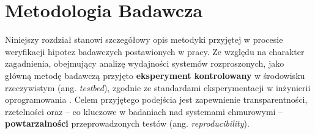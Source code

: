 \newpage


% 
% 
% 
% 
% 
% 
% 
% 
% 
% 
% 
% 
% 


\section{Metodologia Badawcza}

Niniejszy rozdział stanowi szczegółowy opis metodyki przyjętej w procesie weryfikacji hipotez badawczych postawionych 
w pracy. Ze względu na charakter zagadnienia, obejmujący analizę wydajności systemów rozproszonych, jako główną metodę 
badawczą przyjęto \textbf{eksperyment kontrolowany} w środowisku rzeczywistym (ang. \textit{testbed}), zgodnie ze 
standardami eksperymentacji w inżynierii oprogramowania \cite{wohlin2012experimentation}. Celem przyjętego podejścia 
jest zapewnienie transparentności, rzetelności oraz -- co kluczowe w badaniach nad systemami chmurowymi -- 
\textbf{powtarzalności} przeprowadzonych testów (ang. \textit{reproducibility}).

